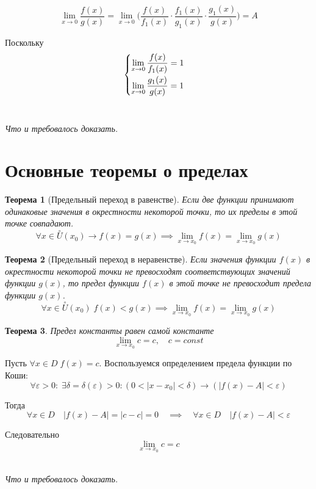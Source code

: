\documentclass[a4paper,12pt,oneside]{extbook}
\newcommand{\newpar}{$ $\par\nobreak\ignorespaces}
\theoremstyle{numbered}
\theoremstyle{unnumbered}
\theoremstyle{named}
\newtheorem{theorem}{Теорема}[section]
\theoremstyle{unnumbered}
\theoremstyle{named}
\theoremstyle{named}
\theoremstyle{named}
\renewenvironment{proof}[1][]{\breakenv[Доказательство]{\if\relax\detokenize{#1}\relax\else\;\fi}{\textbf{#1}}}{\smallskip\newpar \hfill\textit{Что и требовалось доказать.}}
\begin{document}
\begin{proof}
    \[
        \lim_{x \to 0}{\dfrac{f(x)}{g(x)}} = \lim_{x \to 0}{\Big(\dfrac{f(x)}{f_1(x)} \cdot \dfrac{f_1(x)}{g_1(x)} \cdot \dfrac{g_1(x)}{g(x)}\Big)} = A
    \]

    Поскольку
    \[
        \begin{cases}
            \smallskip
            \displaystyle \lim_{x \to 0}{\frac{f(x)}{f_1(x)}} = 1 \\
            \displaystyle \lim_{x \to 0}{\frac{g_1(x)}{g(x)}} = 1
        \end{cases}
    \]
\end{proof}

\section{Основные теоремы о пределах}%
\label{sec:Основные теоремы о пределах}

\begin{theorem}[Предельный переход в равенстве]
    Если две функции принимают одинаковые значения в окрестности некоторой точки, то их пределы в этой точке совпадают.
    \[
        \forall x \in \overset{\circ}{U}(x_0) \rightarrow f(x) = g(x) \implies \lim_{x \to x_0}{f(x)} = \lim_{x \to x_0}{g(x)}
    \]
\end{theorem}

\begin{theorem}[Предельный переход в неравенстве]
    Если значения функции \(f(x)\) в окрестности некоторой точки не превосходят соответствующих значений функции \(g(x)\), то предел функции \(f(x)\) в этой точке не превосходит предела функции \(g(x)\).
    \[
        \forall x \in \overset{\circ}{U}(x_0) \; f(x) < g(x) \implies \lim_{x \to x_0}{f(x)} = \lim_{x \to x_0}{g(x)}
    \]
\end{theorem}

\begin{theorem}
    Предел константы равен самой константе
    \[
        \lim_{x \to x_0}{c} = c, \quad c = const
    \]
\end{theorem}

\begin{proof}
    Пусть \(\forall x \in D \; f(x) = c\).
    Воспользуемся определением предела функции по Коши:
    \[
        \forall \varepsilon > 0: \; \exists \delta = \delta(\varepsilon) > 0: (0 < |x - x_0| < \delta) \rightarrow (|f(x) - A| < \varepsilon)
    \]

    Тогда
    \[
        \forall x \in D \quad |f(x) - A| = |c - c| = 0 \quad \implies \quad \forall x \in D \quad |f(x) - A | < \varepsilon
    \]

    Следовательно
    \[
        \lim_{x \to x_0}{c} = c
    \]
\end{proof}
\end{document}
